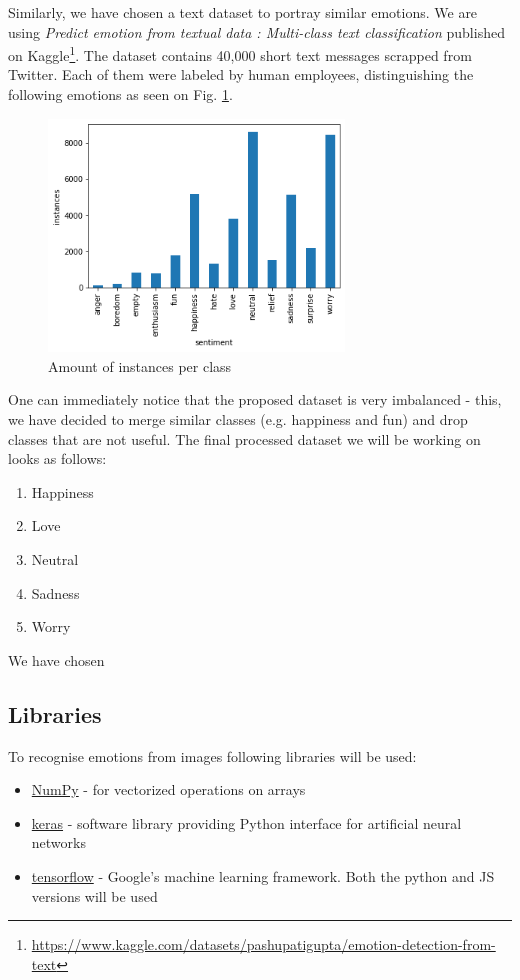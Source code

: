 \documentclass{ledger}
\begin{document}
Similarly, we have chosen a text dataset to portray similar emotions. We are using \emph{Predict emotion from textual data : Multi-class text classification} published on Kaggle\footnote{\url{https://www.kaggle.com/datasets/pashupatigupta/emotion-detection-from-text}}.
The dataset contains 40,000 short text messages scrapped from Twitter. Each of them were labeled by human employees, distinguishing the following emotions as seen on Fig. \ref{fig:textds-classes}.

\begin{figure}[H]
	\centering
	\includegraphics[width=0.7\textwidth]{assets/text_dataset_classes.png}
	\caption{Amount of instances per class}
	\label{fig:textds-classes}
\end{figure}

One can immediately notice that the proposed dataset is very imbalanced - this, we have decided to merge similar classes (e.g. happiness and fun) and drop classes that are not useful. The final processed dataset we will be working on looks as follows:
\begin{enumerate}
	\item Happiness
	\item Love
	\item Neutral
	\item Sadness
	\item Worry

\end{enumerate}

We have chosen

\hfill

\subsection{Libraries}
To recognise emotions from images following libraries will be used:
\begin{itemize}
	\item{} \href{https://numpy.org}{NumPy} - for vectorized operations on arrays
	\item{} \href{https://keras.io}{keras} - software library providing Python interface for artificial neural networks
	\item{} \href{https://www.tensorflow.org/}{tensorflow} - Google's machine learning framework. Both the python and JS versions will be used

\end{itemize}
\end{document}
